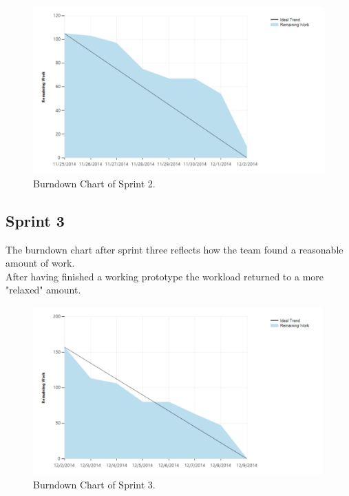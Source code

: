 \begin{figure}[H]
	\centering
	\includegraphics[scale=0.40]{Figures/Burndown2}
	\caption{Burndown Chart of Sprint 2.}
\end{figure}

\subsection{Sprint 3}
The burndown chart after sprint three reflects how the team found a reasonable amount of work. \\
After having finished a working prototype the workload returned to a more "relaxed" amount.

\begin{figure}[H]
	\centering
	\includegraphics[scale=0.40]{Figures/Burndown3}
	\caption{Burndown Chart of Sprint 3.}
\end{figure}

